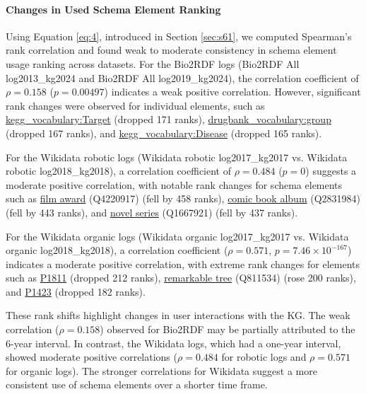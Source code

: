 \documentclass[sw]{iosart2x}
\begin{document}
\paragraph{\textbf{Changes in Used Schema Element Ranking}}
Using Equation \ref{eq:4}, introduced in Section \ref{sec:s61}, we computed Spearman's rank correlation and found weak to moderate consistency in schema element usage ranking across datasets. For the Bio2RDF logs (Bio2RDF All log2013\_kg2024 and Bio2RDF All log2019\_kg2024), the correlation coefficient of $\rho = 0.158$ ($p = 0.00497$) indicates a weak positive correlation. However, significant rank changes were observed for individual elements, such as \sloppy  %
\href{http://bio2rdf.org/kegg_vocabulary:Target}{kegg\_vocabulary:Target} (dropped 171 ranks), \href{http://bio2rdf.org/drugbank_vocabulary:group}{drugbank\_vocabulary:group} (dropped 167 ranks), and \href{http://bio2rdf.org/kegg_vocabulary:Disease}{kegg\_vocabulary:Disease} (dropped 165 ranks).

For the Wikidata robotic logs (Wikidata robotic log2017\_kg2017 vs. Wikidata robotic log2018\_kg2018), a correlation coefficient of $\rho = 0.484$ ($p = 0$) suggests a
moderate positive correlation, with notable rank changes for schema elements such as 
\href{http://www.wikidata.org/entity/Q4220917}{film award} (Q4220917) (fell by 458 ranks), 
\href{http://www.wikidata.org/entity/Q2831984}{comic book album} (Q2831984) (fell by 443 ranks), and 
\href{http://www.wikidata.org/entity/Q1667921}{novel series} (Q1667921) (fell by 437 ranks).

For the Wikidata organic logs (Wikidata organic log2017\_kg2017 vs. Wikidata organic log2018\_kg2018), a correlation coefficient ($\rho = 0.571$, $p = 7.46 \times 10^{-167}$) indicates a moderate positive correlation, with extreme rank changes for elements such as 
\href{http://www.wikidata.org/prop/direct/P1811}{P1811} (dropped 212 ranks), 
\href{http://www.wikidata.org/entity/Q811534}{remarkable tree} (Q811534) (rose 200 ranks), and 
\href{http://www.wikidata.org/prop/direct/P1423}{P1423} (dropped 182 ranks).

These rank shifts highlight changes in user interactions with the KG. The weak correlation ($\rho = 0.158$) observed for Bio2RDF may be partially attributed to the 6-year interval. In contrast, the Wikidata logs, which had a one-year interval, showed moderate positive correlations ($\rho = 0.484$ for robotic logs and $\rho = 0.571$ for organic logs). The stronger correlations for Wikidata suggest a more consistent use of schema elements over a shorter time frame.
\end{document}
